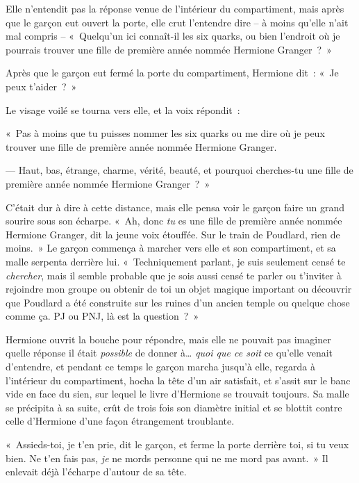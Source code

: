 Elle n'entendit pas la réponse venue de l'intérieur du compartiment, mais après que le garçon eut ouvert la porte, elle crut l'entendre dire -- à moins qu'elle n'ait mal compris -- «~Quelqu'un ici connaît-il les six quarks, ou bien l'endroit où je pourrais trouver une fille de première année nommée Hermione Granger~?~»

Après que le garçon eut fermé la porte du compartiment, Hermione dit~: «~Je peux t'aider~?~»

Le visage voilé se tourna vers elle, et la voix répondit~:

«~Pas à moins que tu puisses nommer les six quarks ou me dire où je peux trouver une fille de première année nommée Hermione Granger.

--- Haut, bas, étrange, charme, vérité, beauté\footnotemark{}, et pourquoi cherches-tu une fille de première année nommée Hermione Granger~?~»

C'était dur à dire à cette distance, mais elle pensa voir le garçon faire un grand sourire sous son écharpe. «~Ah, donc \emph{tu} es une fille de première année nommée Hermione Granger, dit la jeune voix étouffée. Sur le train de Poudlard, rien de moins.~» Le garçon commença à marcher vers elle et son compartiment, et sa malle serpenta derrière lui. «~Techniquement parlant, je suis seulement censé te \emph{chercher}, mais il semble probable que je sois aussi censé te parler ou t'inviter à rejoindre mon groupe ou obtenir de toi un objet magique important ou découvrir que Poudlard a été construite sur les ruines d'un ancien temple ou quelque chose comme ça. PJ ou PNJ, là est la question~?~»

Hermione ouvrit la bouche pour répondre, mais elle ne pouvait pas imaginer quelle réponse il était \emph{possible} de donner à… \emph{quoi que ce soit} ce qu'elle venait d'entendre, et pendant ce temps le garçon marcha jusqu'à elle, regarda à l'intérieur du compartiment, hocha la tête d'un air satisfait, et s'assit sur le banc vide en face du sien, sur lequel le livre d'Hermione se trouvait toujours. Sa malle se précipita à sa suite, crût de trois fois son diamètre initial et se blottit contre celle d'Hermione d'une façon étrangement troublante.

«~Assieds-toi, je t'en prie, dit le garçon, et ferme la porte derrière toi, si tu veux bien. Ne t'en fais pas, \emph{je} ne mords personne qui ne me mord pas avant.~» Il enlevait déjà l'écharpe d'autour de sa tête.

